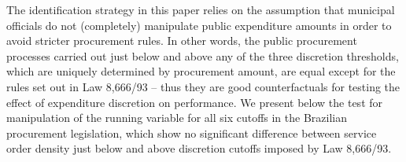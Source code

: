 \documentclass[11pt]{article}
\begin{document}
The identification strategy in this paper relies on the assumption that municipal officials do not (completely) manipulate public expenditure amounts in order to avoid stricter procurement rules. In other words, the public procurement processes carried out just below and above any of the three discretion thresholds, which are uniquely determined by procurement amount, are equal except for the rules set out in Law 8,666/93 -- thus they are good counterfactuals for testing the effect of expenditure discretion on performance. We present below the \citet{McCraryManipulationrunningvariable2008} test for manipulation of the running variable for all six cutoffs in the Brazilian procurement legislation, which show no significant difference between service order density just below and above discretion cutoffs imposed by Law 8,666/93.
\end{document}
